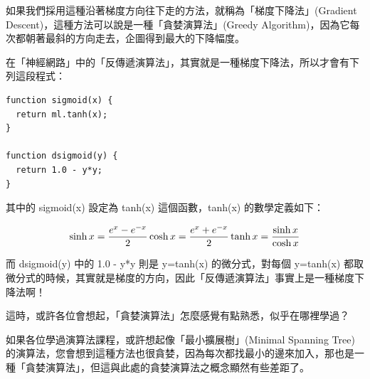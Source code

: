 \documentclass{article}
\begin{document}
如果我們採用這種沿著梯度方向往下走的方法，就稱為「梯度下降法」(Gradient Descent)，這種方法可以說是一種「貪婪演算法」(Greedy Algorithm)，因為它每次都朝著最斜的方向走去，企圖得到最大的下降幅度。

在「神經網路」中的「反傳遞演算法」，其實就是一種梯度下降法，所以才會有下列這段程式：

\begin{lstlisting}
function sigmoid(x) {
  return ml.tanh(x);
}

function dsigmoid(y) {
  return 1.0 - y*y;
}
\end{lstlisting}


其中的 sigmoid(x) 設定為 tanh(x) 這個函數，tanh(x) 的數學定義如下：

\begin{equation}
\sinh x = {{e^x  - e^{ - x} } \over 2} \\
\cosh x = {{e^x  + e^{ - x} } \over 2} \\
\tanh x = {{\sinh x} \over {\cosh x}}\\
\end{equation}

而 dsigmoid(y) 中的  1.0 - y*y  則是 y=tanh(x) 的微分式，對每個 y=tanh(x) 都取微分式的時候，其實就是梯度的方向，因此「反傳遞演算法」事實上是一種梯度下降法啊！

這時，或許各位會想起，「貪婪演算法」怎麼感覺有點熟悉，似乎在哪裡學過？

如果各位學過演算法課程，或許想起像「最小擴展樹」(Minimal Spanning Tree) 的演算法，您會想到這種方法也很貪婪，因為每次都找最小的邊來加入，那也是一種「貪婪演算法」，但這與此處的貪婪演算法之概念顯然有些差距了。


  
\end{document}
